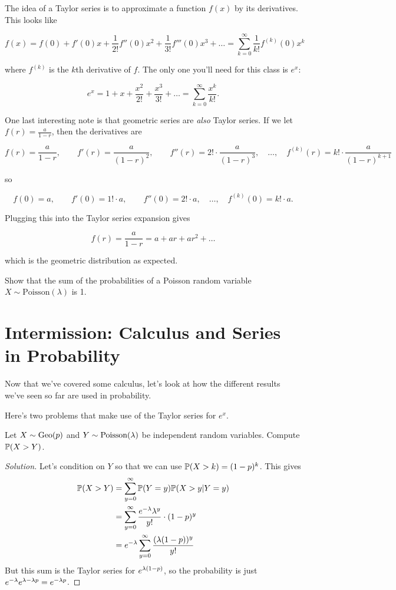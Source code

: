 \documentclass[11 pt]{scrartcl}
\begin{document}
The idea of a Taylor series is to approximate a function $f(x)$ by its derivatives. This looks like 

\[ f(x) = f(0) + f'(0)x + \dfrac{1}{2!} f''(0) x^2 + \dfrac{1}{3!} f'''(0)x^3 + \dots = \sum_{k=0}^\infty \dfrac{1}{k!}f^{(k)}(0)x^k\] 

where $f^{(k)}$ is the $k$th derivative of $f$. The only one you'll need for this class is $e^x$: 

\[ e^x = 1 + x + \dfrac{x^2}{2!} + \dfrac{x^3}{3!} + \dots = \sum_{k=0}^\infty \dfrac{x^k}{k!}.\] 

One last interesting note is that geometric series are \emph{also} Taylor series. If we let $f(r) = \frac{a}{1-r}$, then the derivatives are 

\[ f(r) = \frac{a}{1-r}, \quad\quad f'(r) = \frac{a}{(1-r)^2}, \quad\quad f''(r) = 2!\cdot\frac{a}{(1-r)^3}, \quad\dots,\quad f^{(k)}(r) = k!\cdot \dfrac{a}{(1-r)^{k+1}} \]

so 

\[ f(0) = a, \quad\quad f'(0) = 1!\cdot a, \quad\quad f''(0) = 2!\cdot a, \quad\dots,\quad f^{(k)}(0) = k!\cdot a.\]

Plugging this into the Taylor series expansion gives 

\[ f(r) = \dfrac{a}{1-r} = a + ar + ar^2 + \dots\]

which is the geometric distribution as expected. 

\begin{exercise}
    Show that the sum of the probabilities of a Poisson random variable $X\sim \text{Poisson}(\lambda)$ is 1. 
\end{exercise}

\section{Intermission: Calculus and Series in Probability}
Now that we've covered some calculus, let's look at how the different results we've seen so far are used in probability. 

Here's two problems that make use of the Taylor series for $e^x$. 
\begin{example}[Dis 12 \#3]
    Let $X \sim \text{Geo}(p)$ and $Y \sim \text{Poisson}(\lambda)$ be independent random variables. Compute $\mathbb P(X > Y)$. 
\end{example}
\begin{proof}[Solution]
    Let's condition on $Y$ so that we can use $\mathbb P(X > k) = (1-p)^k$. This gives 
    \begin{align*}
        \mathbb P(X > Y) &= \sum_{y=0}^\infty \mathbb P(Y=y) \mathbb P(X > y | Y = y) \\ 
                   &= \sum_{y=0}^\infty \dfrac{e^{-\lambda}\lambda^y}{y!}\cdot (1-p)^y \\ 
                   &= e^{-\lambda}\sum_{y=0}^\infty \dfrac{(\lambda(1-p))^y}{y!} 
    \end{align*}
    But this sum is the Taylor series for $e^{\lambda(1-p)}$, so the probability is just $e^{-\lambda}e^{\lambda-\lambda p} = e^{-\lambda p}$. 
\end{proof}
\end{document}
